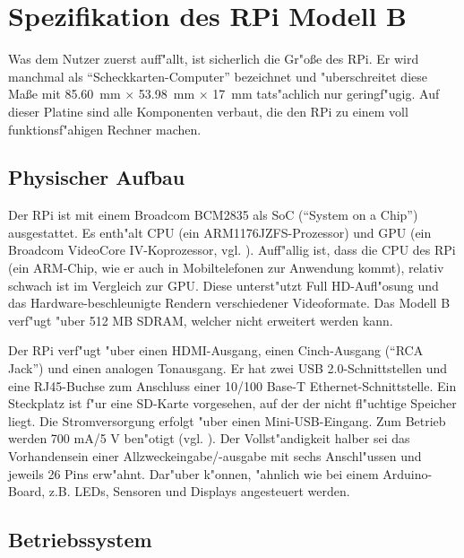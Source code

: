 \section{Spezifikation des RPi Modell B}\label{RPi-Spezi}

Was dem Nutzer zuerst auff"allt, ist sicherlich die Gr"o\ss e des RPi. Er wird manchmal als "`Scheckkarten-Computer"' bezeichnet und "uberschreitet diese Ma\ss e mit 85.60~mm $\times$ 53.98~mm $\times$ 17~mm tats"achlich nur geringf"ugig. Auf dieser Platine sind alle Komponenten verbaut, die den RPi zu einem voll funktionsf"ahigen Rechner machen.

\subsection{Physischer Aufbau}\label{RPi-Hardware}

Der RPi ist mit einem Broadcom BCM2835 als SoC ("`System on a Chip"') ausgestattet. Es enth"alt CPU (ein ARM1176JZFS-Prozessor) und GPU (ein Broadcom VideoCore IV-Koprozessor, vgl. \cite{scrguide02}). Auff"allig ist, dass die CPU des RPi (ein ARM-Chip, wie er auch in Mobiltelefonen zur Anwendung kommt), relativ schwach ist im Vergleich zur GPU. Diese unterst"utzt Full HD-Aufl"osung und das Hardware-beschleunigte Rendern verschiedener Videoformate. Das Modell B verf"ugt "uber 512 MB SDRAM, welcher nicht erweitert werden kann. 

Der RPi verf"ugt "uber einen HDMI-Ausgang, einen Cinch-Ausgang ("`RCA Jack"') und einen analogen Tonausgang. Er hat zwei USB 2.0-Schnittstellen und eine RJ45-Buchse zum Anschluss einer 10/100 Base-T Ethernet-Schnittstelle. Ein Steckplatz ist f"ur eine SD-Karte vorgesehen, auf der der nicht fl"uchtige Speicher liegt. Die Stromversorgung erfolgt "uber einen Mini-USB-Eingang. Zum Betrieb werden 700 mA/5 V ben"otigt (vgl. \cite{pow12}). Der Vollst"andigkeit halber sei das Vorhandensein einer Allzweckeingabe/-ausgabe mit sechs Anschl"ussen und jeweils 26 Pins erw"ahnt. Dar"uber k"onnen, "ahnlich wie bei einem Arduino-Board, z.B. LEDs, Sensoren und Displays angesteuert werden. 


\subsection{Betriebssystem}\label{RPi-OS}


